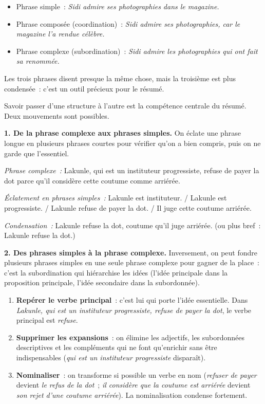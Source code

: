 \documentclass[11pt]{article}
\newcommand{\cle}[1]{{\popxbold\color{popdark}#1}}
\newcounter{popsec}
\newcounter{popsub}
\newcommand{\courssub}[1]{%
  \stepcounter{popsub}%
  \par\vspace{9pt}\noindent{\popxbold\fontsize{11.5}{13}\selectfont\color{popink}{\color{poporange}\thepopsec.\thepopsub}\hspace{6pt}#1}\par\nopagebreak\vspace{4pt}
}
\begin{document}
\begin{exemplebox}
\begin{itemize}
\item Phrase simple~: \emph{Sidi admire ses photographies dans le magazine.}
\item Phrase composée (coordination)~: \emph{Sidi admire ses photographies, car le magazine l'a rendue célèbre.}
\item Phrase complexe (subordination)~: \emph{Sidi admire les photographies qui ont fait sa renommée.}
\end{itemize}
Les trois phrases disent presque la même chose, mais la troisième est plus condensée~: c'est un outil précieux pour le résumé.
\end{exemplebox}

\courssub{Transformer les phrases pour condenser}

Savoir passer d'une structure à l'autre est la compétence centrale du résumé. Deux mouvements sont possibles.

\textbf{1. De la phrase complexe aux phrases simples.} On éclate une phrase longue en plusieurs phrases courtes pour vérifier qu'on a bien compris, puis on ne garde que l'essentiel.

\emph{Phrase complexe~:} Lakunle, qui est un instituteur progressiste, refuse de payer la dot parce qu'il considère cette coutume comme arriérée.

\emph{Éclatement en phrases simples~:} Lakunle est instituteur. / Lakunle est progressiste. / Lakunle refuse de payer la dot. / Il juge cette coutume arriérée.

\emph{Condensation~:} Lakunle refuse la dot, coutume qu'il juge arriérée. (ou plus bref~: Lakunle refuse la dot.)

\textbf{2. Des phrases simples à la phrase complexe.} Inversement, on peut fondre plusieurs phrases simples en une seule phrase complexe pour gagner de la place~: c'est la \cle{subordination} qui hiérarchise les idées (l'idée principale dans la proposition principale, l'idée secondaire dans la subordonnée).

\begin{methode}
\begin{enumerate}
\item \textbf{Repérer le verbe principal}~: c'est lui qui porte l'idée essentielle. Dans \emph{Lakunle, qui est un instituteur progressiste, refuse de payer la dot}, le verbe principal est \emph{refuse}.
\item \textbf{Supprimer les expansions}~: on élimine les adjectifs, les subordonnées descriptives et les compléments qui ne font qu'enrichir sans être indispensables (\emph{qui est un instituteur progressiste} disparaît).
\item \textbf{Nominaliser}~: on transforme si possible un verbe en nom (\emph{refuser de payer} devient \emph{le refus de la dot}~; \emph{il considère que la coutume est arriérée} devient \emph{son rejet d'une coutume arriérée}). La nominalisation condense fortement.
\end{enumerate}
\end{methode}
\end{document}
